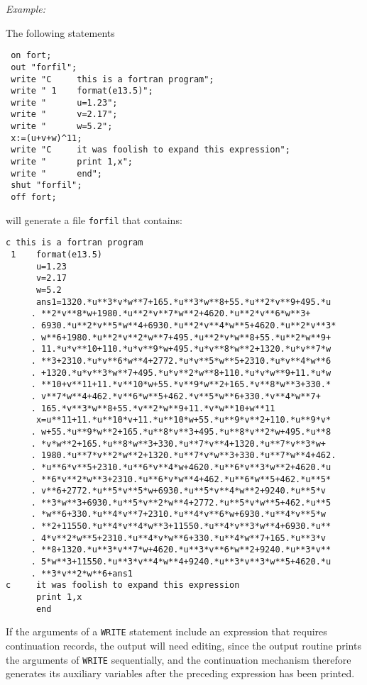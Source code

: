 \textit{Example:}

The following {\REDUCE} statements
\begin{verbatim}
 on fort;
 out "forfil";
 write "C     this is a fortran program";
 write " 1    format(e13.5)";
 write "      u=1.23";
 write "      v=2.17";
 write "      w=5.2";
 x:=(u+v+w)^11;
 write "C     it was foolish to expand this expression";
 write "      print 1,x";
 write "      end";
 shut "forfil";
 off fort;
\end{verbatim}
will generate a file \texttt{forfil} that contains:

{\small
\begin{verbatim}
c this is a fortran program
 1    format(e13.5)
      u=1.23
      v=2.17
      w=5.2
      ans1=1320.*u**3*v*w**7+165.*u**3*w**8+55.*u**2*v**9+495.*u
     . **2*v**8*w+1980.*u**2*v**7*w**2+4620.*u**2*v**6*w**3+
     . 6930.*u**2*v**5*w**4+6930.*u**2*v**4*w**5+4620.*u**2*v**3*
     . w**6+1980.*u**2*v**2*w**7+495.*u**2*v*w**8+55.*u**2*w**9+
     . 11.*u*v**10+110.*u*v**9*w+495.*u*v**8*w**2+1320.*u*v**7*w
     . **3+2310.*u*v**6*w**4+2772.*u*v**5*w**5+2310.*u*v**4*w**6
     . +1320.*u*v**3*w**7+495.*u*v**2*w**8+110.*u*v*w**9+11.*u*w
     . **10+v**11+11.*v**10*w+55.*v**9*w**2+165.*v**8*w**3+330.*
     . v**7*w**4+462.*v**6*w**5+462.*v**5*w**6+330.*v**4*w**7+
     . 165.*v**3*w**8+55.*v**2*w**9+11.*v*w**10+w**11
      x=u**11+11.*u**10*v+11.*u**10*w+55.*u**9*v**2+110.*u**9*v*
     . w+55.*u**9*w**2+165.*u**8*v**3+495.*u**8*v**2*w+495.*u**8
     . *v*w**2+165.*u**8*w**3+330.*u**7*v**4+1320.*u**7*v**3*w+
     . 1980.*u**7*v**2*w**2+1320.*u**7*v*w**3+330.*u**7*w**4+462.
     . *u**6*v**5+2310.*u**6*v**4*w+4620.*u**6*v**3*w**2+4620.*u
     . **6*v**2*w**3+2310.*u**6*v*w**4+462.*u**6*w**5+462.*u**5*
     . v**6+2772.*u**5*v**5*w+6930.*u**5*v**4*w**2+9240.*u**5*v
     . **3*w**3+6930.*u**5*v**2*w**4+2772.*u**5*v*w**5+462.*u**5
     . *w**6+330.*u**4*v**7+2310.*u**4*v**6*w+6930.*u**4*v**5*w
     . **2+11550.*u**4*v**4*w**3+11550.*u**4*v**3*w**4+6930.*u**
     . 4*v**2*w**5+2310.*u**4*v*w**6+330.*u**4*w**7+165.*u**3*v
     . **8+1320.*u**3*v**7*w+4620.*u**3*v**6*w**2+9240.*u**3*v**
     . 5*w**3+11550.*u**3*v**4*w**4+9240.*u**3*v**3*w**5+4620.*u
     . **3*v**2*w**6+ans1
c     it was foolish to expand this expression
      print 1,x
      end
\end{verbatim}
}
If the arguments of a \texttt{WRITE} statement include an expression that
requires continuation records, the output will need editing, since the
output routine prints the arguments of \texttt{WRITE} sequentially, and the
continuation mechanism therefore generates its auxiliary variables after
the preceding expression has been printed.

